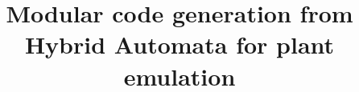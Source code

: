 \documentclass[conference]{IEEEtran}
\begin{document}
\title{Modular code generation from Hybrid Automata for plant emulation }

\author{}




\maketitle


\begin{abstract}

\end{abstract}









 
\end{document}
